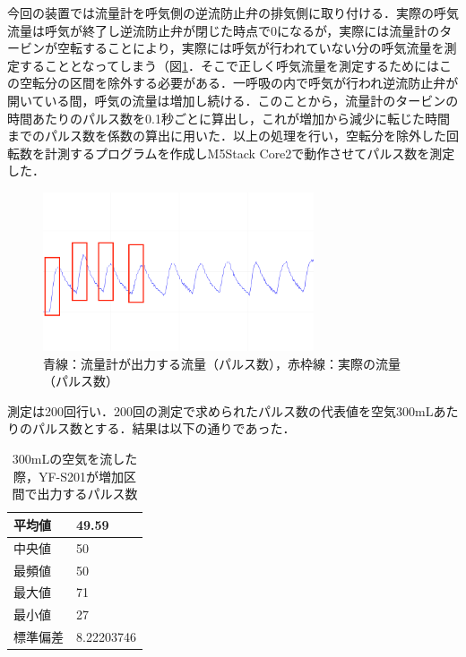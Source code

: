 今回の装置では流量計を呼気側の逆流防止弁の排気側に取り付ける．実際の呼気流量は呼気が終了し逆流防止弁が閉じた時点で0になるが，実際には流量計のタービンが空転することにより，実際には呼気が行われていない分の呼気流量を測定することとなってしまう（図\ref{fig:flowsensor_increased_section}．そこで正しく呼気流量を測定するためにはこの空転分の区間を除外する必要がある．一呼吸の内で呼気が行われ逆流防止弁が開いている間，呼気の流量は増加し続ける．このことから，流量計のタービンの時間あたりのパルス数を0.1秒ごとに算出し，これが増加から減少に転じた時間までのパルス数を係数の算出に用いた．以上の処理を行い，空転分を除外した回転数を計測するプログラムを作成しM5Stack Core2で動作させてパルス数を測定した．

\begin{figure}[H]
  \begin{center}
    \includegraphics[width=8cm]{fig/flowsensor_increased_section}
    \caption{青線：流量計が出力する流量（パルス数），赤枠線：実際の流量（パルス数）}
    \label{fig:flowsensor_increased_section}
  \end{center}
\end{figure}

測定は200回行い．200回の測定で求められたパルス数の代表値を空気300mLあたりのパルス数とする．結果は以下の通りであった．

\begin{table}[H]
\begin{center}
\begin{tabular}{|l|l|}
\hline
平均値  & 49.59      \\ \hline
中央値  & 50         \\ \hline
最頻値  & 50         \\ \hline
最大値  & 71         \\ \hline
最小値  & 27         \\ \hline
標準偏差 & 8.22203746 \\ \hline
\end{tabular}
\caption{300mLの空気を流した際，YF-S201が増加区間で出力するパルス数}
\label{tb:flowsensor_result}
\end{center}
\end{table}

